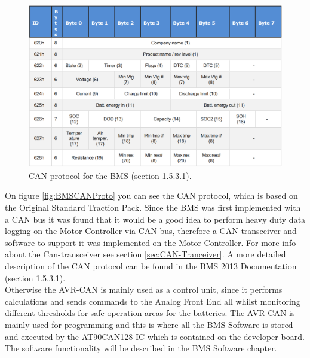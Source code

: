 \begin{figure}[H]
	\centering
	\includegraphics[width=1.0\linewidth]{Hardware/Pictures/BMSCANProto}
	\caption[Empty]{CAN protocol for the BMS \cite{BMSDocumentation} (section 1.5.3.1).}
	\label{fig:BMSCANProto}
\end{figure}

On figure \vref{fig:BMSCANProto} you can see the CAN protocol, which is based on the Original Standard Traction Pack. Since the BMS was first implemented with a CAN bus it was found that it would be a good idea to perform heavy duty data logging on the Motor Controller via CAN bus, therefore a CAN transceiver and software to support it was implemented on the Motor Controller. For more info about the Can-transceiver see section \vref{sec:CAN-Tranceiver}. A more detailed description of the CAN protocol can be found in the BMS 2013 Documentation \cite{BMSDocumentation} (section 1.5.3.1).\\
Otherwise the AVR-CAN is mainly used as a control unit, since it performs calculations and sends commands to the Analog Front End all whilst monitoring different thresholds for safe operation areas for the batteries. The AVR-CAN is mainly used for programming and this is where all the BMS Software is stored and executed by the AT90CAN128 IC which is contained on the developer board. The software functionality will be described in the BMS Software chapter.  %

